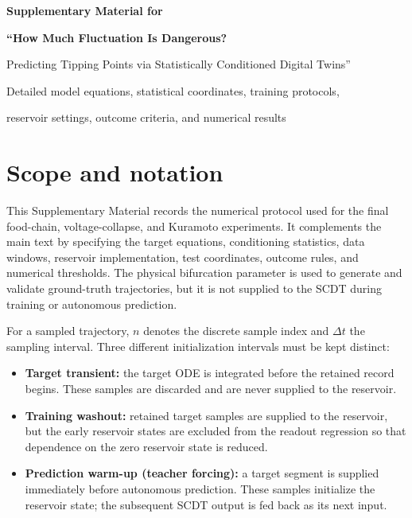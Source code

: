\documentclass[10pt,a4paper]{article}
\begin{document}

\begin{titlepage}
  \thispagestyle{empty}
  \centering
  \vspace*{0.26\textheight}
  {\color{navy}\bfseries\fontsize{24}{31}\selectfont
  Supplementary Material for\par}
  \vspace{9mm}
  {\bfseries\fontsize{20}{27}\selectfont
  ``How Much Fluctuation Is Dangerous?\par
  Predicting Tipping Points via Statistically Conditioned Digital Twins''\par}
  \vfill
  {\large Detailed model equations, statistical coordinates, training protocols,\par
  reservoir settings, outcome criteria, and numerical results\par}
  \vspace*{0.12\textheight}
\end{titlepage}

\tableofcontents
\clearpage
{}

\section{Scope and notation}

This Supplementary Material records the numerical protocol used for the final
food-chain, voltage-collapse, and Kuramoto experiments. It complements the main
text by specifying the target equations, conditioning statistics, data windows,
reservoir implementation, test coordinates, outcome rules, and numerical
thresholds. The physical bifurcation parameter is used to generate and validate
ground-truth trajectories, but it is not supplied to the SCDT during training or
autonomous prediction.

For a sampled trajectory, $n$ denotes the discrete sample index and $\Delta t$
the sampling interval. Three different initialization intervals must be kept
distinct:

\begin{itemize}
  \item \textbf{Target transient:} the target ODE is integrated before the
  retained record begins. These samples are discarded and are never supplied to
  the reservoir.
  \item \textbf{Training washout:} retained target samples are supplied to the
  reservoir, but the early reservoir states are excluded from the readout
  regression so that dependence on the zero reservoir state is reduced.
  \item \textbf{Prediction warm-up (teacher forcing):} a target segment is
  supplied immediately before autonomous prediction. These samples initialize
  the reservoir state; the subsequent SCDT output is fed back as its next input.
\end{itemize}
\end{document}
